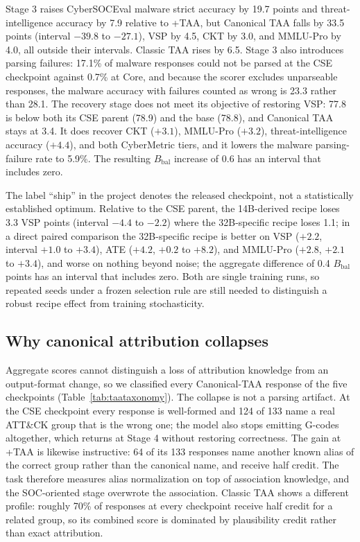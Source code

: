 \documentclass[preprint,12pt,authoryear]{elsarticle}
\newcommand{\Bbal}{B_{\mathrm{bal}}}
\begin{document}
Stage 3 raises CyberSOCEval malware strict accuracy by 19.7 points and threat-intelligence accuracy by 7.9 relative to +TAA, but Canonical TAA falls by 33.5 points (interval $-39.8$ to $-27.1$), VSP by 4.5, CKT by 3.0, and MMLU-Pro by 4.0, all outside their intervals. Classic TAA rises by 6.5. Stage 3 also introduces parsing failures: 17.1\% of malware responses could not be parsed at the CSE checkpoint against 0.7\% at Core, and because the scorer excludes unparseable responses, the malware accuracy with failures counted as wrong is 23.3 rather than 28.1. The recovery stage does not meet its objective of restoring VSP: 77.8 is below both its CSE parent (78.9) and the base (78.8), and Canonical TAA stays at 3.4. It does recover CKT ($+3.1$), MMLU-Pro ($+3.2$), threat-intelligence accuracy ($+4.4$), and both CyberMetric tiers, and it lowers the malware parsing-failure rate to 5.9\%. The resulting $\Bbal$ increase of 0.6 has an interval that includes zero.

The label ``ship'' in the project denotes the released checkpoint, not a statistically established optimum. Relative to the CSE parent, the 14B-derived recipe loses 3.3 VSP points (interval $-4.4$ to $-2.2$) where the 32B-specific recipe loses 1.1; in a direct paired comparison the 32B-specific recipe is better on VSP ($+2.2$, interval $+1.0$ to $+3.4$), ATE ($+4.2$, $+0.2$ to $+8.2$), and MMLU-Pro ($+2.8$, $+2.1$ to $+3.4$), and worse on nothing beyond noise; the aggregate difference of 0.4 $\Bbal$ points has an interval that includes zero. Both are single training runs, so repeated seeds under a frozen selection rule are still needed to distinguish a robust recipe effect from training stochasticity.

\subsection{Why canonical attribution collapses}
Aggregate scores cannot distinguish a loss of attribution knowledge from an output-format change, so we classified every Canonical-TAA response of the five checkpoints (Table~\ref{tab:taataxonomy}). The collapse is not a parsing artifact. At the CSE checkpoint every response is well-formed and 124 of 133 name a real ATT\&CK group that is the wrong one; the model also stops emitting G-codes altogether, which returns at Stage 4 without restoring correctness. The gain at +TAA is likewise instructive: 64 of its 133 responses name another known alias of the correct group rather than the canonical name, and receive half credit. The task therefore measures alias normalization on top of association knowledge, and the SOC-oriented stage overwrote the association. Classic TAA shows a different profile: roughly 70\% of responses at every checkpoint receive half credit for a related group, so its combined score is dominated by plausibility credit rather than exact attribution.
\end{document}
